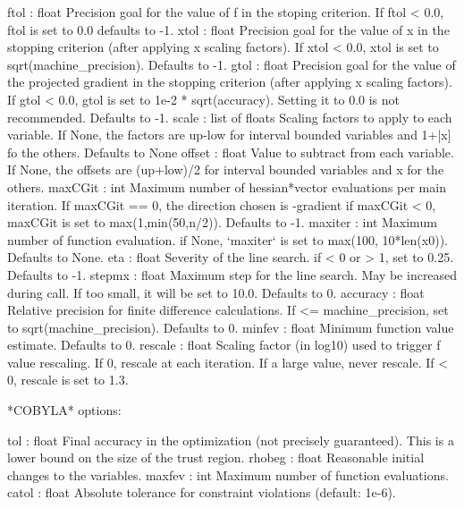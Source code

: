 \begin{DoxyVerb}
    ftol : float
        Precision goal for the value of f in the stoping criterion.
        If ftol < 0.0, ftol is set to 0.0 defaults to -1.
    xtol : float
        Precision goal for the value of x in the stopping
        criterion (after applying x scaling factors).  If xtol <
        0.0, xtol is set to sqrt(machine_precision).  Defaults to
        -1.
    gtol : float
        Precision goal for the value of the projected gradient in
        the stopping criterion (after applying x scaling factors).
        If gtol < 0.0, gtol is set to 1e-2 * sqrt(accuracy).
        Setting it to 0.0 is not recommended.  Defaults to -1.
    scale : list of floats
        Scaling factors to apply to each variable.  If None, the
        factors are up-low for interval bounded variables and
        1+|x] fo the others.  Defaults to None
    offset : float
        Value to subtract from each variable.  If None, the
        offsets are (up+low)/2 for interval bounded variables
        and x for the others.
    maxCGit : int
        Maximum number of hessian*vector evaluations per main
        iteration.  If maxCGit == 0, the direction chosen is
        -gradient if maxCGit < 0, maxCGit is set to
        max(1,min(50,n/2)).  Defaults to -1.
    maxiter : int
        Maximum number of function evaluation.  if None, `maxiter` is
        set to max(100, 10*len(x0)).  Defaults to None.
    eta : float
        Severity of the line search. if < 0 or > 1, set to 0.25.
        Defaults to -1.
    stepmx : float
        Maximum step for the line search.  May be increased during
        call.  If too small, it will be set to 10.0.  Defaults to 0.
    accuracy : float
        Relative precision for finite difference calculations.  If
        <= machine_precision, set to sqrt(machine_precision).
        Defaults to 0.
    minfev : float
        Minimum function value estimate.  Defaults to 0.
    rescale : float
        Scaling factor (in log10) used to trigger f value
        rescaling.  If 0, rescale at each iteration.  If a large
        value, never rescale.  If < 0, rescale is set to 1.3.

*COBYLA* options:

    tol : float
        Final accuracy in the optimization (not precisely guaranteed).
        This is a lower bound on the size of the trust region.
    rhobeg : float
        Reasonable initial changes to the variables.
    maxfev : int
        Maximum number of function evaluations.
    catol : float
        Absolute tolerance for constraint violations (default: 1e-6).


\end{DoxyVerb}
